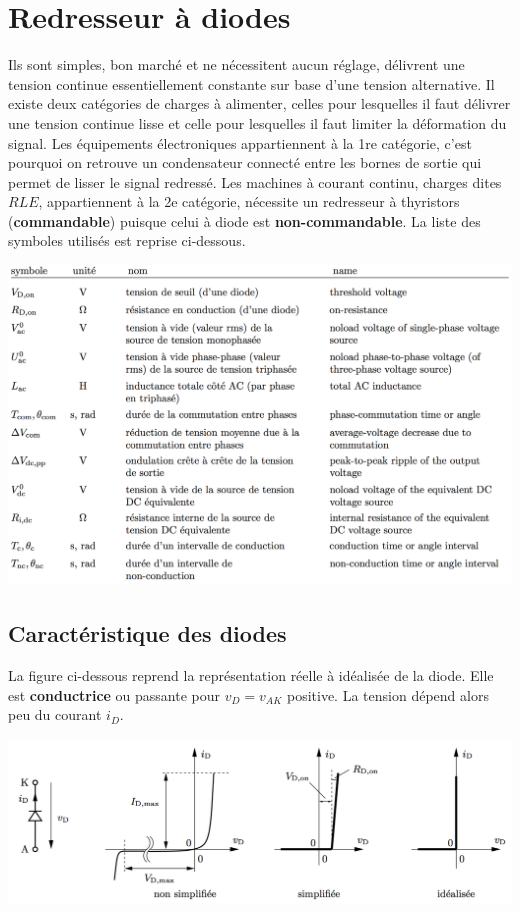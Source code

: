 
\chapter{Redresseur à diodes}
	
	Ils sont simples, bon marché et ne nécessitent aucun réglage, délivrent une tension continue essentiellement constante sur base d'une tension alternative. Il existe deux catégories de charges à alimenter, celles pour lesquelles il faut délivrer une tension continue lisse et celle pour lesquelles il faut limiter la déformation du signal. Les équipements électroniques appartiennent à la 1re catégorie, c'est pourquoi on retrouve un condensateur connecté entre les bornes de sortie qui permet de lisser le signal redressé. Les machines à courant continu, charges dites $RLE$, appartiennent à la 2e catégorie, nécessite un redresseur à thyristors (\textbf{commandable}) puisque celui à diode est \textbf{non-commandable}. La liste des symboles utilisés est reprise ci-dessous.
	
	\begin{center}
	\includegraphics[scale=0.45]{ch2/1}
	\end{center}
	\newpage
	
	\section{Caractéristique des diodes}
		La figure ci-dessous reprend la représentation réelle à idéalisée de la diode. Elle est \textbf{conductrice} ou passante pour $v_D=v_{AK}$ positive. La tension dépend alors peu du courant $i_D$. 
		
		\begin{center}
		\includegraphics[scale=0.45]{ch2/2}
		\end{center}			
		
